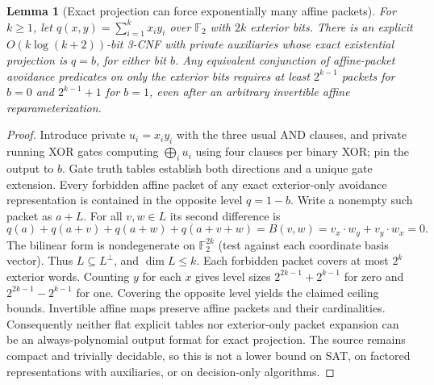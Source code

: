 \documentclass[11pt]{article}
\newtheorem{lemma}[theorem]{Lemma}
\begin{document}
\begin{lemma}[Exact projection can force exponentially many affine packets]\label{lem:bs17-cover}
For $k\ge1$, let $q(x,y)=\sum_{i=1}^k x_i y_i$ over $\mathbb F_2$ with $2k$ exterior bits. There is an explicit $O(k\log(k+2))$-bit 3-CNF with private auxiliaries whose exact existential projection is $q=b$, for either bit $b$. Any equivalent conjunction of affine-packet avoidance predicates on only the exterior bits requires at least $2^{k-1}$ packets for $b=0$ and $2^{k-1}+1$ for $b=1$, even after an arbitrary invertible affine reparameterization.
\end{lemma}
\begin{proof}
Introduce private $u_i=x_iy_i$ with the three usual AND clauses, and private running XOR gates computing $\bigoplus_i u_i$ using four clauses per binary XOR; pin the output to $b$. Gate truth tables establish both directions and a unique gate extension. Every forbidden affine packet of any exact exterior-only avoidance representation is contained in the opposite level $q=1-b$. Write a nonempty such packet as $a+L$. For all $v,w\in L$ its second difference is
\[
q(a)+q(a+v)+q(a+w)+q(a+v+w)
=B(v,w)=v_x\cdot w_y+v_y\cdot w_x=0 .
\]
The bilinear form is nondegenerate on $\mathbb F_2^{2k}$ (test against each coordinate basis vector). Thus $L\subseteq L^\perp$, and $\dim L\le k$. Each forbidden packet covers at most $2^k$ exterior words. Counting $y$ for each $x$ gives level sizes $2^{2k-1}+2^{k-1}$ for zero and $2^{2k-1}-2^{k-1}$ for one. Covering the opposite level yields the claimed ceiling bounds. Invertible affine maps preserve affine packets and their cardinalities. Consequently neither flat explicit tables nor exterior-only packet expansion can be an always-polynomial output format for exact projection. The source remains compact and trivially decidable, so this is not a lower bound on SAT, on factored representations with auxiliaries, or on decision-only algorithms.
\end{proof}
\end{document}
